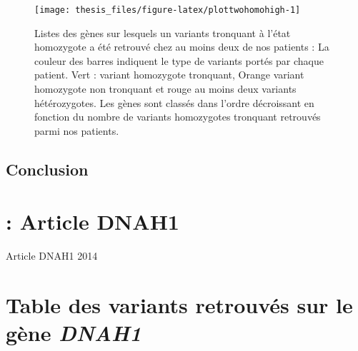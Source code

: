 \documentclass[12pt,twoside]{reedthesis}
\theoremstyle{definition}
\theoremstyle{definition}
\theoremstyle{remark}
\begin{document}
  \newpage
  
  \begin{figure}
  
  {\centering \texttt{[image: thesis\_files/figure-latex/plottwohomohigh-1]} 
  
  }
  
  \caption[Listes des gènes sur lesquels un variants tronquant à l'état homozygote a été retrouvé chez au moins deux de nos patients]{Listes des gènes sur lesquels un variants tronquant à l'état homozygote a été retrouvé chez au moins deux de nos patients : La couleur des barres indiquent le type de variants portés par chaque patient. Vert : variant homozygote tronquant, Orange variant homozygote non tronquant et rouge au moins deux variants hétérozygotes. Les gènes sont classés dans l'ordre décroissant en fonction du nombre de variants homozygotes tronquant retrouvés parmi nos patients.}\label{fig:plottwohomohigh}
  \end{figure}
  
  \newpage
  
  \section{Conclusion}\label{conclusion}
  
  \appendix
  
  \chapter{: Article DNAH1}\label{article-dnah1}
  
  Article DNAH1 2014
  
  \newpage
  
  \chapter{\texorpdfstring{Table des variants retrouvés sur le gène
  \emph{DNAH1}}{Table des variants retrouvés sur le gène DNAH1}}\label{table-des-variants-retrouves-sur-le-gene-dnah1}
  
\end{document}
